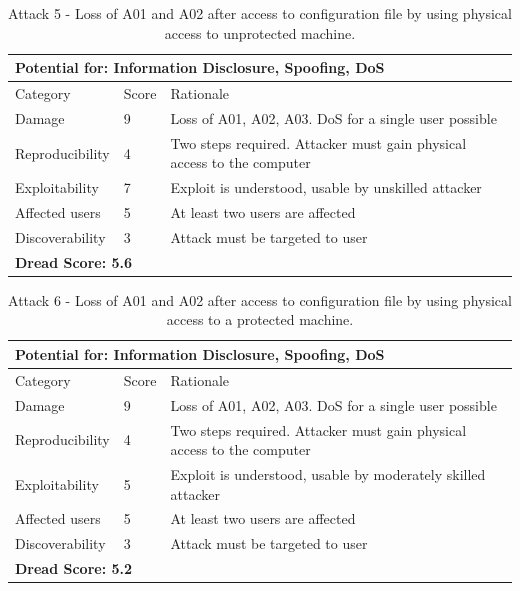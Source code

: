 \documentclass [11pt, proquest] {uwthesis}[2020/02/24]
\begin{document}
\begin{table}[H]
\label{attack5-ref}
\begin{tabular}{|m{3cm}|m{.9cm}|p{27em} |}
\multicolumn{3}{l}{Potential for: Information Disclosure, Spoofing, DoS}                   \\
\hline
Category & Score & Rationale \\
\hline
Damage          & 9     & Loss of A01, A02, A03. DoS for a single user possible            \\
\hline
Reproducibility & 4     & Two steps required. Attacker must gain physical access to the computer     \\
\hline
Exploitability & 7      & Exploit is understood, usable by unskilled attacker \\
\hline
Affected users  & 5     & At least two users are affected                      \\
\hline
Discoverability & 3     & Attack must be targeted to user \\
\hline
\multicolumn{3}{l}{\textbf{Dread Score: 5.6}} 
\end{tabular}
\caption{Attack 5 - Loss of A01 and A02 after access to configuration file by using physical access to unprotected machine.}
\end{table}

\begin{table}[H]
\label{attack6-ref}
\begin{tabular}{|m{3cm}|m{.9cm}|p{27em} |}
\multicolumn{3}{l}{Potential for: Information Disclosure, Spoofing, DoS}                   \\
\hline
Category & Score & Rationale \\
\hline
Damage          & 9     & Loss of A01, A02, A03. DoS for a single user possible            \\
\hline
Reproducibility & 4     & Two steps required. Attacker must gain physical access to the computer     \\
\hline
Exploitability & 5      & Exploit is understood, usable by moderately skilled attacker  \\
\hline
Affected users  & 5     & At least two users are affected                      \\
\hline
Discoverability & 3     & Attack must be targeted to user \\
\hline
\multicolumn{3}{l}{\textbf{Dread Score: 5.2}} 
\end{tabular}
\caption{Attack 6 - Loss of A01 and A02 after access to configuration file by using physical access to a protected machine.}
\end{table}
\end{document}
